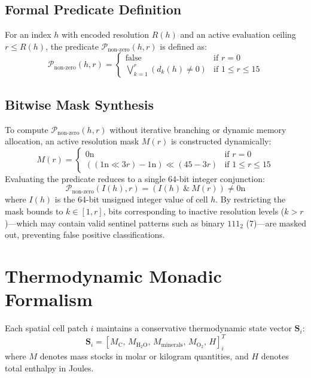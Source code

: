 \documentclass[10pt,journal,compsoc]{IEEEtran}
\begin{document}
\subsection{Formal Predicate Definition}
For an index $h$ with encoded resolution $R(h)$ and an active evaluation ceiling $r \le R(h)$, the predicate $\mathcal{P}_{\text{non-zero}}(h, r)$ is defined as:
\begin{equation}
\mathcal{P}_{\text{non-zero}}(h, r) = \begin{cases}
\text{false} & \text{if } r = 0 \\
\bigvee_{k=1}^r (d_k(h) \neq 0) & \text{if } 1 \le r \le 15
\end{cases}
\end{equation}

\subsection{Bitwise Mask Synthesis}
To compute $\mathcal{P}_{\text{non-zero}}(h, r)$ without iterative branching or dynamic memory allocation, an active resolution mask $M(r)$ is constructed dynamically:
\begin{equation}
M(r) = \begin{cases}
0\text{n} & \text{if } r = 0 \\
\left( (1\text{n} \ll 3r) - 1\text{n} \right) \ll (45 - 3r) & \text{if } 1 \le r \le 15
\end{cases}
\end{equation}
Evaluating the predicate reduces to a single 64-bit integer conjunction:
\begin{equation}
\mathcal{P}_{\text{non-zero}}(I(h), r) = \left( I(h) \ \& \ M(r) \right) \neq 0\text{n}
\end{equation}
where $I(h)$ is the 64-bit unsigned integer value of cell $h$. By restricting the mask bounds to $k \in [1, r]$, bits corresponding to inactive resolution levels ($k > r$)—which may contain valid sentinel patterns such as binary $111_2$ ($7$)—are masked out, preventing false positive classifications.

\section{Thermodynamic Monadic Formalism}

Each spatial cell patch $i$ maintains a conservative thermodynamic state vector $\mathbf{S}_i$:
\begin{equation}
\mathbf{S}_i = \left[ M_{\text{C}}, \, M_{\text{H}_2\text{O}}, \, M_{\text{minerals}}, \, M_{\text{O}_2}, \, H \right]_i^T
\end{equation}
where $M$ denotes mass stocks in molar or kilogram quantities, and $H$ denotes total enthalpy in Joules.
\end{document}
